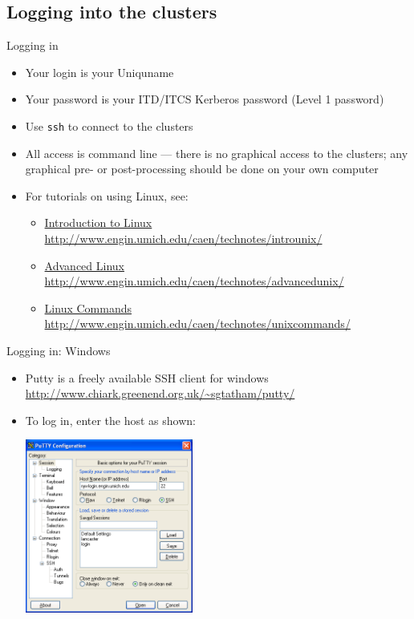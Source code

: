 \documentclass{beamer}
\begin{document}
  \subsection{Logging into the clusters}
  \begin{frame}{Logging in}
    \begin{itemize}
      \item<1-> Your login is your Uniquname
      \item<1-> Your password is your ITD/ITCS Kerberos password (Level 1 password)
      \item<1-> Use \texttt{ssh} to connect to the clusters
      \item<2-> All access is command line --- there is no graphical access to the clusters; any 
	graphical pre- or post-processing should be done on your own computer
      \item<3-> For tutorials on using Linux, see:
	\begin{itemize}
	  \item
\href{http://www.engin.umich.edu/caen/technotes/introunix/}{Introduction to Linux}\\
             \tiny\url{http://www.engin.umich.edu/caen/technotes/introunix/}\normalsize
          \item \href{http://www.engin.umich.edu/caen/technotes/advancedunix/}{Advanced Linux}\\
             \tiny\url{http://www.engin.umich.edu/caen/technotes/advancedunix/}\normalsize
          \item \href{http://www.engin.umich.edu/caen/technotes/unixcommands/}{Linux Commands}\\
             \tiny\url{http://www.engin.umich.edu/caen/technotes/unixcommands/}\normalsize
	\end{itemize}
    \end{itemize}
  \end{frame}
  \begin{frame}{Logging in: Windows}
    \begin{itemize}
    \item Putty is a freely available SSH client for windows\\
      \url{http://www.chiark.greenend.org.uk/~sgtatham/putty/}
    \item To log in, enter the host as shown:
      \begin{center}\includegraphics[height=2.25in]{ssh-putty-login}\end{center}
    \end{itemize}
  \end{frame}
\end{document}

